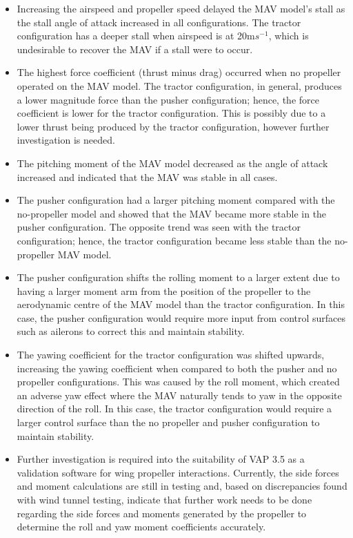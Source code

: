 \begin{itemize}

    \item Increasing the airspeed and propeller speed delayed the \acrshort{MAV} model's stall as the stall angle of attack increased in all configurations. The tractor configuration has a deeper stall when airspeed is at 20m$s^{-1}$, which is undesirable to recover the \acrshort{MAV} if a stall were to occur. 

    \item  The highest force coefficient (thrust minus drag) occurred when no propeller operated on the \acrshort{MAV} model. The tractor configuration, in general, produces a lower magnitude force than the pusher configuration; hence, the force coefficient is lower for the tractor configuration. This is possibly due to a lower thrust being produced by the tractor configuration, however further investigation is needed. 

    \item The pitching moment of the \acrshort{MAV} model decreased as the angle of attack increased and indicated that the \acrshort{MAV} was stable in all cases. 
    
    \item The pusher configuration had a larger pitching moment compared with the no-propeller model and showed that the \acrshort{MAV} became more stable in the pusher configuration. The opposite trend was seen with the tractor configuration; hence, the tractor configuration became less stable than the no-propeller \acrshort{MAV} model.

    \item The pusher configuration shifts the rolling moment to a larger extent due to having a larger moment arm from the position of the propeller to the aerodynamic centre of the \acrshort{MAV} model than the tractor configuration. In this case, the pusher configuration would require more input from control surfaces such as ailerons to correct this and maintain stability.

    \item  The yawing coefficient for the tractor configuration was shifted upwards, increasing the yawing coefficient when compared to both the pusher and no propeller configurations. This was caused by the roll moment, which created an adverse yaw effect where the \acrshort{MAV} naturally tends to yaw in the opposite direction of the roll. In this case, the tractor configuration would require a larger control surface than the no propeller and pusher configuration to maintain stability. 
    
    \item Further investigation is required into the suitability of VAP 3.5 as a validation software for wing propeller interactions. Currently, the side forces and moment calculations are still in testing and, based on discrepancies found with wind tunnel testing, indicate that further work needs to be done regarding the side forces and moments generated by the propeller to determine the roll and yaw moment coefficients accurately. 
    
    
\end{itemize}


